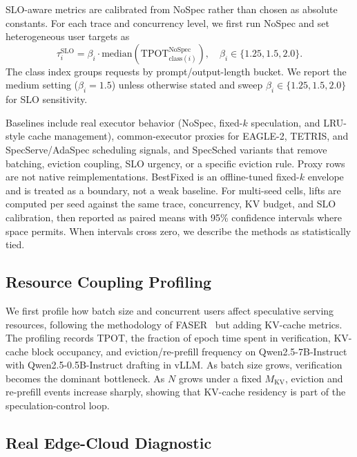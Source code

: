 \documentclass[journal]{IEEEtran}
\newcommand{\system}{SpecSched}
\begin{document}
SLO-aware metrics are calibrated from NoSpec rather than chosen as
absolute constants. For each trace and concurrency level, we first run
NoSpec and set heterogeneous user targets as
\begin{equation}
  \tau_i^{\text{SLO}} =
  \beta_i \cdot \mathrm{median}\!\left(
  \text{TPOT}^{\text{NoSpec}}_{\mathrm{class}(i)}\right),
  \quad \beta_i \in \{1.25, 1.5, 2.0\}.
\end{equation}
The class index groups requests by prompt/output-length bucket. We
report the medium setting ($\beta_i=1.5$) unless otherwise stated and
sweep $\beta_i\in\{1.25,1.5,2.0\}$ for SLO sensitivity.

Baselines include real executor behavior (NoSpec, fixed-$k$
speculation, and LRU-style cache management), common-executor proxies
for EAGLE-2, TETRIS, and SpecServe/AdaSpec scheduling signals, and
\system{} variants that remove batching, eviction coupling, SLO urgency,
or a specific eviction rule. Proxy rows are not native
reimplementations. BestFixed is an offline-tuned fixed-$k$ envelope and
is treated as a boundary, not a weak baseline.
For multi-seed cells, lifts are computed per seed against the same
trace, concurrency, KV budget, and SLO calibration, then reported as
paired means with 95\% confidence intervals where space permits. When
intervals cross zero, we describe the methods as statistically tied.

\subsection{Resource Coupling Profiling}
\label{sec:profiling}

We first profile how batch size and concurrent users 
affect speculative serving resources, following the 
methodology of FASER~\cite{chen2026faser} but adding 
KV-cache metrics. The profiling records TPOT, the fraction 
of epoch time spent in verification, KV-cache block occupancy, 
and eviction/re-prefill frequency on Qwen2.5-7B-Instruct with
Qwen2.5-0.5B-Instruct drafting in vLLM. As batch size grows,
verification becomes the dominant 
bottleneck. As $N$ grows under a fixed $M_{\text{KV}}$, 
eviction and re-prefill events increase sharply, showing that
KV-cache residency is part of the speculation-control loop.

\subsection{Real Edge-Cloud Diagnostic}
\label{sec:edge-practical}
\end{document}
